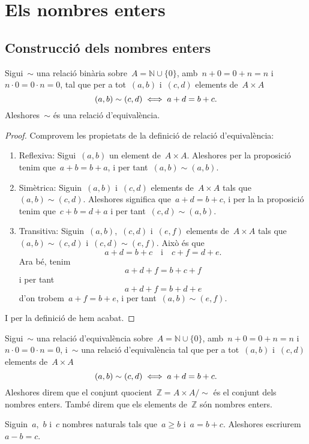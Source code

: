 \documentclass[../../Main.tex]{subfiles}
\begin{document}
\section{Els nombres enters}
	\subsection{Construcció dels nombres enters}
	\begin{proposition}
		Sigui~\(\sim\) una relació binària sobre~\(A=\mathbb{N}\cup\{0\}\), amb~\(n+0=0+n=n\) i~\(n\cdot 0=0\cdot n=0\), tal que per a tot~\((a,b)\) i~\((c,d)\) elements de~\(A\times A\)
		\[
		    (a,b)\sim(c,d)\iff a+d=b+c.
		\]
		Aleshores~\(\sim\) és una relació d'equivalència.
		\begin{proof}
			Comprovem les propietats de la definició de relació d'equivalència:
			\begin{enumerate}
				\item Reflexiva: Sigui~\((a,b)\) un element de~\(A\times A\).
				Aleshores per la proposició  tenim que~\(a+b=b+a\), i per tant~\((a,b)\sim(a,b)\).
				\item Simètrica: Siguin~\((a,b)\) i~\((c,d)\) elements de~\(A\times A\) tals que~\((a,b)\sim(c,d)\).
				Aleshores significa que~\(a+d=b+c\), i per la la proposició  tenim que~\(c+b=d+a\) i per tant~\((c,d)\sim(a,b)\).
				\item Transitiva: Siguin~\((a,b)\),~\((c,d)\) i~\((e,f)\) elements de~\(A\times A\) tals que~\((a,b)\sim(c,d)\) i~\((c,d)\sim(e,f)\).
				Això és que
				\[
				    a+d=b+c\quad\text{i}\quad c+f=d+e.
				\]
				Ara bé, tenim
				\[
				    a+d+f=b+c+f
				\]
				i per tant
				\[
				    a+d+f=b+d+e
				\]
				d'on trobem~\(a+f=b+e\), i per tant~\((a,b)\sim(e,f)\).
			\end{enumerate}
			I per la definició de  hem acabat.
		\end{proof}
	\end{proposition}
	\begin{definition}
		\label{def:nombres enters}
		Sigui~\(\sim\) una relació d'equivalència sobre~\(A=\mathbb{N}\cup\{0\}\), amb~\(n+0=0+n=n\) i~\(n\cdot 0=0\cdot n=0\), i~\(\sim\) una relació d'equivalència tal que per a tot~\((a,b)\) i~\((c,d)\) elements de~\(A\times A\)
		\[
		    (a,b)\sim(c,d)\iff a+d=b+c.
		\]
		Aleshores direm que el conjunt quocient~\(\mathbb{Z}=A\times A/\sim\) és el conjunt dels nombres enters.
		També direm que els elements de~\(\mathbb{Z}\) són nombres enters.
	\end{definition}
	\begin{definition}
		\label{def:resta de nombres naturals}
		Siguin~\(a\),~\(b\) i~\(c\) nombres naturals tals que~\(a\geq b\) i~\(a=b+c\).
		Aleshores escriurem~\(a-b=c\).
	\end{definition}
\end{document}

